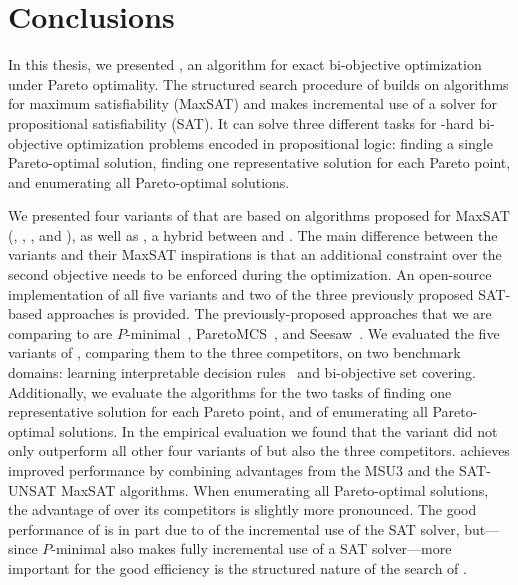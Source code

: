 \chapter{Conclusions\label{chap:conclusion}}

In this thesis, we presented \algname{}, an algorithm for exact bi-objective optimization under Pareto optimality.
The structured search procedure of \algname{} builds on algorithms for maximum satisfiability (MaxSAT) and makes incremental use of a solver for propositional satisfiability (SAT).
It can solve three different tasks for \NP-hard bi-objective optimization problems encoded in propositional logic:
finding a single Pareto-optimal solution, finding one representative solution for each Pareto point, and enumerating all Pareto-optimal solutions.

We presented four variants of \algname{} that are based on algorithms proposed for MaxSAT (\satunsat{}, \unsatsat{}, \msu{}, and \oll{}), as well as \msh{}, a hybrid between \msu{} and \satunsat{}.
The main difference between the \algname{} variants and their MaxSAT inspirations is that an additional constraint over the second objective needs to be enforced during the optimization.
An open-source implementation of all five variants and two of the three previously proposed SAT-based approaches is provided.
The previously-proposed approaches that we are comparing \algname{} to are $P$-minimal~\autocite{DBLP:conf/cp/SohBTB17}, ParetoMCS~\autocite{DBLP:conf/ijcai/Terra-NevesLM18a}, and Seesaw~\autocite{DBLP:conf/cp/JanotaMSM21}.
We evaluated the five variants of \algname{}, comparing them to the three competitors, on two benchmark domains: learning interpretable decision rules~\autocite{DBLP:conf/cp/MaliotovM18} and bi-objective set covering.
Additionally, we evaluate the algorithms for the two tasks of finding one representative solution for each Pareto point, and of enumerating all Pareto-optimal solutions.
In the empirical evaluation we found that the \msh{} variant did not only outperform all other four variants of \algname{} but also the three competitors.
\msh{} achieves improved performance by combining advantages from the MSU3 and the SAT-UNSAT MaxSAT algorithms.
When enumerating all Pareto-optimal solutions, the advantage of \algname{} over its competitors is slightly more pronounced.
The good performance of \algname{} is in part due to of the incremental use of the SAT solver, but---since $P$-minimal also makes fully incremental use of a SAT solver---more important for the good efficiency is the structured nature of the search of \algname{}.

